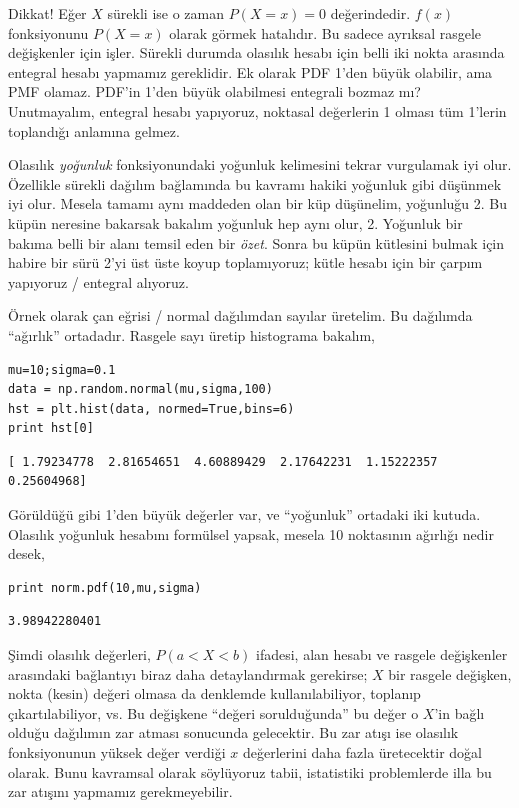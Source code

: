 \documentclass[12pt,fleqn]{article}\usepackage{../../common}
\begin{document}
Dikkat! Eğer $X$ sürekli ise o zaman $P(X = x) = 0$ değerindedir. $f(x)$
fonksiyonunu $P(X=x)$ olarak görmek hatalıdır. Bu sadece ayrıksal rasgele
değişkenler için işler. Sürekli durumda olasılık hesabı için belli iki
nokta arasında entegral hesabı yapmamız gereklidir. Ek olarak PDF 1'den
büyük olabilir, ama PMF olamaz. PDF'in 1'den büyük olabilmesi entegrali
bozmaz mı? Unutmayalım, entegral hesabı yapıyoruz, noktasal değerlerin 1
olması tüm 1'lerin toplandığı anlamına gelmez. 

Olasılık {\em yoğunluk} fonksiyonundaki yoğunluk kelimesini tekrar
vurgulamak iyi olur. Özellikle sürekli dağılım bağlamında bu kavramı hakiki
yoğunluk gibi düşünmek iyi olur. Mesela tamamı aynı maddeden olan bir küp
düşünelim, yoğunluğu 2. Bu küpün neresine bakarsak bakalım yoğunluk hep
aynı olur, 2. Yoğunluk bir bakıma belli bir alanı temsil eden bir
{\em özet}. Sonra bu küpün kütlesini bulmak için habire bir sürü 2'yi üst üste
koyup toplamıyoruz; kütle hesabı için bir çarpım yapıyoruz / entegral
alıyoruz.

Örnek olarak çan eğrisi / normal dağılımdan sayılar üretelim. Bu dağılımda
``ağırlık'' ortadadır. Rasgele sayı üretip histograma bakalım,

\begin{verbatim}
mu=10;sigma=0.1
data = np.random.normal(mu,sigma,100)
hst = plt.hist(data, normed=True,bins=6)
print hst[0]
\end{verbatim}

\begin{verbatim}
[ 1.79234778  2.81654651  4.60889429  2.17642231  1.15222357  0.25604968]
\end{verbatim}

Görüldüğü gibi 1'den büyük değerler var, ve ``yoğunluk'' ortadaki iki
kutuda. Olasılık yoğunluk hesabını formülsel yapsak, mesela 10 noktasının
ağırlığı nedir desek, 

\begin{verbatim}
print norm.pdf(10,mu,sigma)
\end{verbatim}

\begin{verbatim}
3.98942280401
\end{verbatim}

Şimdi olasılık değerleri, $P(a < X < b)$ ifadesi, alan hesabı ve rasgele
değişkenler arasındaki bağlantıyı biraz daha detaylandırmak gerekirse; $X$
bir rasgele değişken, nokta (kesin) değeri olmasa da denklemde
kullanılabiliyor, toplanıp çıkartılabiliyor, vs. Bu değişkene ``değeri
sorulduğunda'' bu değer o $X$'in bağlı olduğu dağılımın zar atması
sonucunda gelecektir. Bu zar atışı ise olasılık fonksiyonunun yüksek değer
verdiği $x$ değerlerini daha fazla üretecektir doğal olarak. Bunu kavramsal
olarak söylüyoruz tabii, istatistiki problemlerde illa bu zar atışını
yapmamız gerekmeyebilir.
\end{document}
